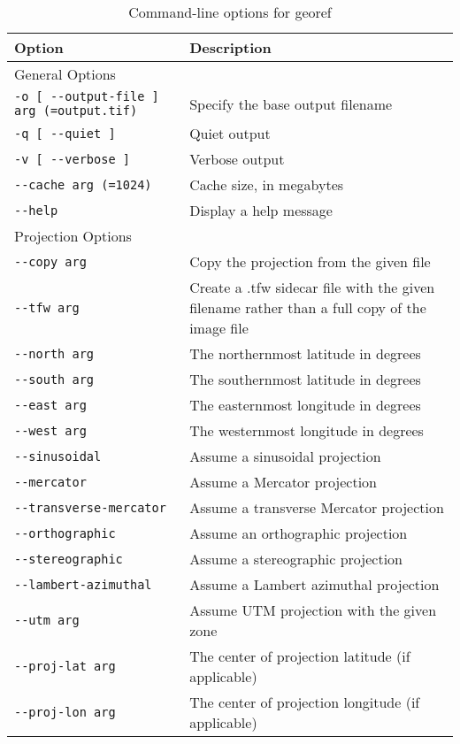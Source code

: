 \begin{longtable}{|l|p{8.5cm}|}
\caption{Command-line options for georef}
\label{tbl:georef}


\endfirsthead
\endhead
\endfoot
\endlastfoot
\hline

Option & Description \\ \hline \hline
General Options \\ \hline
\verb#-o [ --output-file ] arg (=output.tif)# & Specify the base output filename \\ \hline
\verb#-q [ --quiet ]# & Quiet output \\ \hline
\verb#-v [ --verbose ]# & Verbose output \\ \hline
\verb#--cache arg (=1024)# & Cache size, in megabytes \\ \hline
\verb#--help# & Display a help message \\ \hline
Projection Options \\ \hline
\verb#--copy arg# & Copy the projection from the given file \\ \hline
\verb#--tfw arg# & Create a .tfw sidecar file with the given filename rather than a full copy of the image file \\ \hline
\verb#--north arg# & The northernmost latitude in degrees \\ \hline
\verb#--south arg# & The southernmost latitude in degrees \\ \hline
\verb#--east arg# & The easternmost longitude in degrees \\ \hline
\verb#--west arg# & The westernmost longitude in degrees \\ \hline
\verb#--sinusoidal# & Assume a sinusoidal projection \\ \hline
\verb#--mercator# & Assume a Mercator projection \\ \hline
\verb#--transverse-mercator# & Assume a transverse Mercator projection \\ \hline
\verb#--orthographic# & Assume an orthographic projection \\ \hline
\verb#--stereographic# & Assume a stereographic projection \\ \hline
\verb#--lambert-azimuthal# & Assume a Lambert azimuthal projection \\ \hline
\verb#--utm arg# & Assume UTM projection with the given zone \\ \hline
\verb#--proj-lat arg# & The center of projection latitude (if applicable) \\ \hline
\verb#--proj-lon arg# & The center of projection longitude (if applicable) \\ \hline

\end{longtable}
